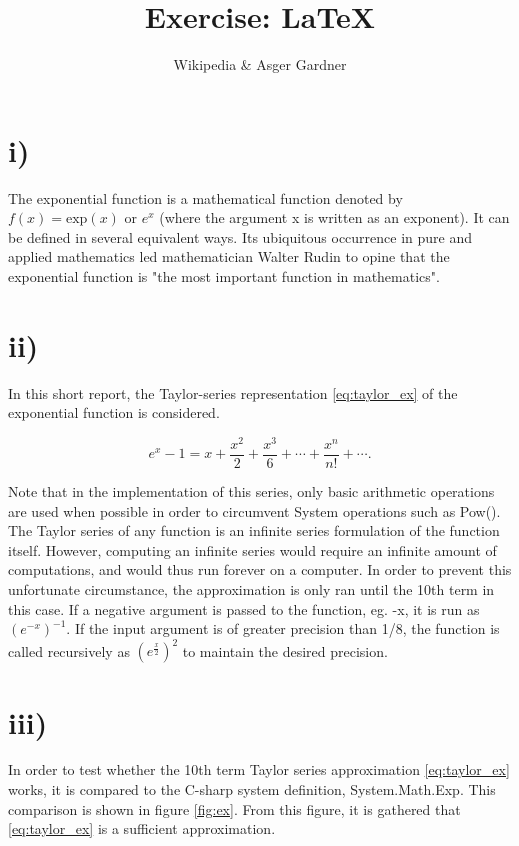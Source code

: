 \documentclass[12pt]{article}
\begin{document}
\title{Exercise: \LaTeX}
\author{Wikipedia \& Asger Gardner}

\maketitle

\section*{i)}

The exponential function is a mathematical function denoted by $f(x)=\text{exp}(x)$ or $e^{x}$ (where the argument x is written as an exponent). It can be defined in several equivalent ways. Its ubiquitous occurrence in pure and applied mathematics led mathematician Walter Rudin to opine that the exponential function is "the most important function in mathematics". 

\section*{ii)}

In this short report, the Taylor-series representation \eqref{eq:taylor_ex} of the exponential function is considered.  

\begin{equation} \label{eq:taylor_ex}
	e^x-1=x+\frac {x^2}2 + \frac{x^3}6+\cdots +\frac{x^n}{n!}+\cdots.	
\end{equation}

Note that in the implementation of this series, only basic arithmetic operations are used when possible in order to circumvent System operations such as Pow(). The Taylor series of any function is an infinite series formulation of the function itself. However, computing an infinite series would require an infinite amount of computations, and would thus run forever on a computer. In order to prevent this unfortunate circumstance, the approximation is only ran until the 10th term in this case. If a negative argument is passed to the function, eg. -x, it is run as $(e^{-x})^{-1}$. If the input argument is of greater precision than 1/8, the function is called recursively as $(e^{\frac{x}{2}})^2$ to maintain the desired precision.

\section*{iii)}

In order to test whether the 10th term Taylor series approximation \eqref{eq:taylor_ex} works, it is compared to the C-sharp system definition, System.Math.Exp. This comparison is shown in figure \ref{fig:ex}. From this figure, it is gathered that \eqref{eq:taylor_ex} is a sufficient approximation. 
\end{document}
